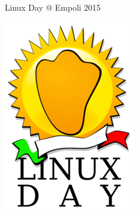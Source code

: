 \documentclass{beamer}
\begin{document}
\begin{frame}
\begin{block}{Linux Day @ Empoli 2015}
\begin{minipage}{.1\linewidth}
      \includegraphics[width=.9\linewidth]{linuxday-logo.png}
    \end{minipage}
  \end{block}

\end{frame}
\end{document}
